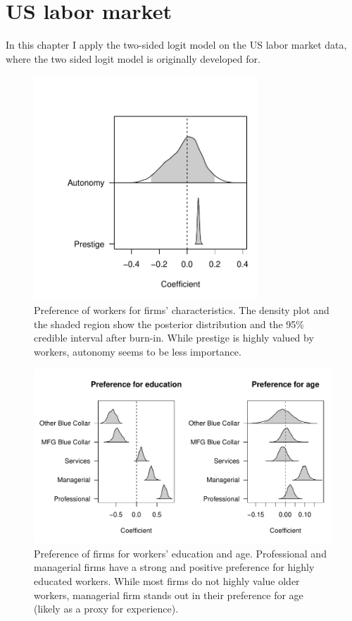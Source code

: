 \chapter{US labor market}
\label{chap:labor}

In this chapter I apply the two-sided logit model on the US labor market data, where the two sided logit model is originally developed for.

\begin{figure}[!ht]
  \centering
  \includegraphics[width=0.75\textwidth,keepaspectratio]{../figure/labor_occ5_alpha}
  \caption[Workers' preference in the US labor market.]{Preference of workers for firms' characteristics. The density plot and the
    shaded region show the posterior distribution and the 95\% credible interval
    after burn-in. While prestige is highly valued by workers, autonomy seems to
    be less importance.}
  \label{fig:labor_occ5_alpha}
\end{figure}

\begin{figure}[!ht]
  \centering
  \includegraphics[width=\textwidth,keepaspectratio]{../figure/labor_occ5_beta_educ_age}
  \caption[Firms' preference in the US labor market]{Preference of firms for workers' education and
    age. Professional and managerial firms have a strong and positive preference
  for highly educated workers. While most firms do not highly value older workers,
  managerial firm stands out in their preference for age (likely as a
  proxy for experience).}
  \label{fig:labor_occ5_beta_educ_age}
\end{figure}

